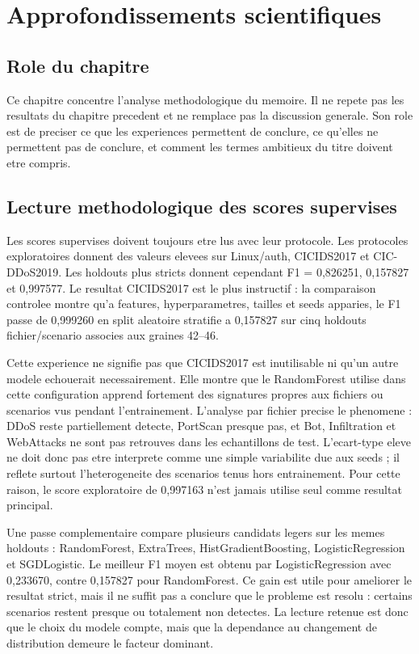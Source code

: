\chapter{Approfondissements scientifiques}

\section{Role du chapitre}
Ce chapitre concentre l'analyse methodologique du memoire. Il ne repete pas les resultats du chapitre precedent et ne remplace pas la discussion generale. Son role est de preciser ce que les experiences permettent de conclure, ce qu'elles ne permettent pas de conclure, et comment les termes ambitieux du titre doivent etre compris.

\section{Lecture methodologique des scores supervises}
Les scores supervises doivent toujours etre lus avec leur protocole. Les protocoles exploratoires donnent des valeurs elevees sur Linux/auth, CICIDS2017 et CIC-DDoS2019. Les holdouts plus stricts donnent cependant F1 = 0,826251, 0,157827 et 0,997577. Le resultat CICIDS2017 est le plus instructif : la comparaison controlee montre qu'a features, hyperparametres, tailles et seeds apparies, le F1 passe de 0,999260 en split aleatoire stratifie a 0,157827 sur cinq holdouts fichier/scenario associes aux graines 42--46.

Cette experience ne signifie pas que CICIDS2017 est inutilisable ni qu'un autre modele echouerait necessairement. Elle montre que le RandomForest utilise dans cette configuration apprend fortement des signatures propres aux fichiers ou scenarios vus pendant l'entrainement. L'analyse par fichier precise le phenomene : DDoS reste partiellement detecte, PortScan presque pas, et Bot, Infiltration et WebAttacks ne sont pas retrouves dans les echantillons de test. L'ecart-type eleve ne doit donc pas etre interprete comme une simple variabilite due aux seeds ; il reflete surtout l'heterogeneite des scenarios tenus hors entrainement. Pour cette raison, le score exploratoire de 0,997163 n'est jamais utilise seul comme resultat principal.

Une passe complementaire compare plusieurs candidats legers sur les memes holdouts : RandomForest, ExtraTrees, HistGradientBoosting, LogisticRegression et SGDLogistic. Le meilleur F1 moyen est obtenu par LogisticRegression avec 0,233670, contre 0,157827 pour RandomForest. Ce gain est utile pour ameliorer le resultat strict, mais il ne suffit pas a conclure que le probleme est resolu : certains scenarios restent presque ou totalement non detectes. La lecture retenue est donc que le choix du modele compte, mais que la dependance au changement de distribution demeure le facteur dominant.

